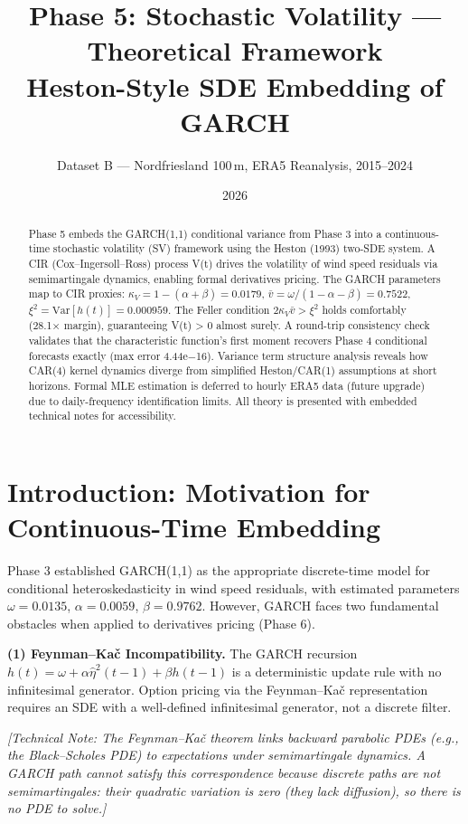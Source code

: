 \documentclass[11pt, a4paper, twoside]{article}
\title{\textbf{Phase 5: Stochastic Volatility --- Theoretical Framework \\ Heston-Style SDE Embedding of GARCH}}
\author{Dataset B --- Nordfriesland 100\,m, ERA5 Reanalysis, 2015--2024}
\date{2026}
\begin{document}
\maketitle

\begin{abstract}
Phase 5 embeds the GARCH(1,1) conditional variance from Phase 3 into a continuous-time stochastic volatility (SV) framework using the Heston (1993) two-SDE system. A CIR (Cox--Ingersoll--Ross) process V(t) drives the volatility of wind speed residuals via semimartingale dynamics, enabling formal derivatives pricing. The GARCH parameters map to CIR proxies: $\kappa_V = 1 - (\alpha + \beta) = 0.0179$, $\bar{v} = \omega/(1-\alpha-\beta) = 0.7522$, $\xi^2 = \text{Var}[h(t)] = 0.000959$. The Feller condition $2\kappa_V\bar{v} > \xi^2$ holds comfortably (28.1× margin), guaranteeing V(t) > 0 almost surely. A round-trip consistency check validates that the characteristic function's first moment recovers Phase 4 conditional forecasts exactly (max error 4.44e−16). Variance term structure analysis reveals how CAR(4) kernel dynamics diverge from simplified Heston/CAR(1) assumptions at short horizons. Formal MLE estimation is deferred to hourly ERA5 data (future upgrade) due to daily-frequency identification limits. All theory is presented with embedded technical notes for accessibility.
\end{abstract}

\section{Introduction: Motivation for Continuous-Time Embedding}

Phase 3 established GARCH(1,1) as the appropriate discrete-time model for conditional heteroskedasticity in wind speed residuals, with estimated parameters $\omega = 0.0135$, $\alpha = 0.0059$, $\beta = 0.9762$. However, GARCH faces two fundamental obstacles when applied to derivatives pricing (Phase 6).

\textbf{(1) Feynman--Kač Incompatibility.} The GARCH recursion $h(t) = \omega + \alpha \hat{\eta}^2(t-1) + \beta h(t-1)$ is a deterministic update rule with no infinitesimal generator. Option pricing via the Feynman--Kač representation requires an SDE with a well-defined infinitesimal generator, not a discrete filter.

\textit{[Technical Note: The Feynman--Kač theorem links backward parabolic PDEs (e.g., the Black--Scholes PDE) to expectations under semimartingale dynamics. A GARCH path cannot satisfy this correspondence because discrete paths are not semimartingales: their quadratic variation is zero (they lack diffusion), so there is no PDE to solve.]}
\end{document}

